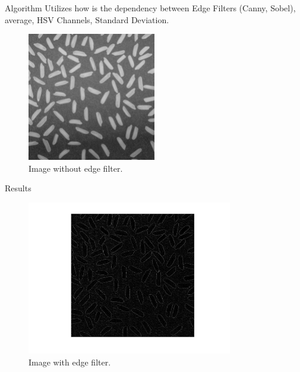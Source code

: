 \documentclass{beamer}
\begin{document}
\begin{frame}{Algorithm}
    Utilizes how is the dependency between Edge Filters (Canny, Sobel), average, HSV Channels, Standard Deviation.

    \begin{figure}
        \centering
        \includegraphics[width=0.5\textwidth]{rice.jpg}
        \caption{Image without edge filter.}
        \label{Bordas}
    \end{figure}
\end{frame}

\begin{frame}{Results}
    \begin{figure}
        \centering
        \includegraphics[width=0.8\textwidth]{Bordas.jpg}
        \caption{Image with edge filter.}
        \label{Bordas1}
    \end{figure}
\end{frame}
\end{document}
